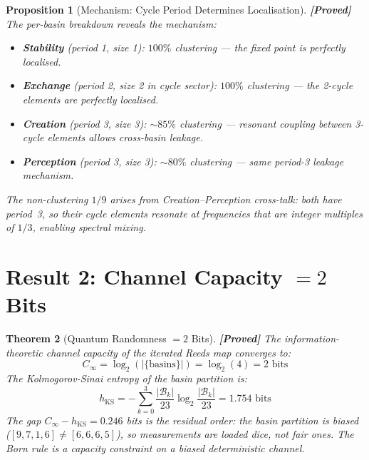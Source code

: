 \documentclass[12pt,a4paper]{article}
\newcommand{\proved}[1]{\textcolor{proved}{\textbf{[Proved]}} #1}
\newtheorem{theorem}{Theorem}[section]
\newtheorem{proposition}[theorem]{Proposition}
\theoremstyle{definition}\newtheorem{definition}[theorem]{Definition}
\theoremstyle{remark}\newtheorem{remark}[theorem]{Remark}
\newcommand{\Basin}{\mathcal{B}}
\begin{document}
\begin{proposition}[Mechanism: Cycle Period Determines Localisation]
\label{prop:mechanism}
\proved{The per-basin breakdown reveals the mechanism:}
\begin{itemize}
  \item \textbf{Stability} (period 1, size 1): $100\%$ clustering --- the fixed point
  is perfectly localised.
  \item \textbf{Exchange} (period 2, size 2 in cycle sector): $100\%$ clustering
  --- the 2-cycle elements are perfectly localised.
  \item \textbf{Creation} (period 3, size 3): $\sim 85\%$ clustering ---
  resonant coupling between 3-cycle elements allows cross-basin leakage.
  \item \textbf{Perception} (period 3, size 3): $\sim 80\%$ clustering ---
  same period-3 leakage mechanism.
\end{itemize}
The non-clustering $1/9$ arises from Creation--Perception cross-talk: both have
period~3, so their cycle elements resonate at frequencies that are integer
multiples of $1/3$, enabling spectral mixing.
\end{proposition}

\section{Result 2: Channel Capacity $= 2$ Bits}
\label{sec:capacity}

\begin{theorem}[Quantum Randomness $= 2$ Bits]
\label{thm:2bits}
\proved{The information-theoretic channel capacity of the iterated Reeds map
converges to:}
\begin{equation}
  C_\infty = \log_2(|\{\text{basins}\}|) = \log_2(4) = 2 \text{ bits}
\end{equation}
The Kolmogorov-Sinai entropy of the basin partition is:
\begin{equation}
  h_{\mathrm{KS}} = -\sum_{k=0}^{3} \frac{|\Basin_k|}{23} \log_2 \frac{|\Basin_k|}{23} = 1.754 \text{ bits}
\end{equation}
The gap $C_\infty - h_{\mathrm{KS}} = 0.246$ bits is the residual order: the
basin partition is biased ($[9,7,1,6] \neq [6,6,6,5]$), so measurements are
loaded dice, not fair ones. The Born rule is a capacity constraint on a biased
deterministic channel.
\end{theorem}
\end{document}
